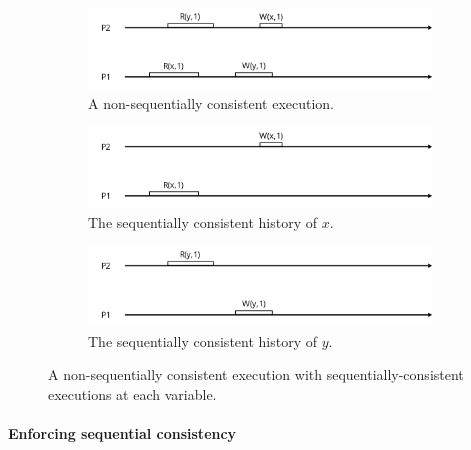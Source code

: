 \documentclass[]             %
{NASA}                       %
\theoremstyle{definition}
\begin{document}
\begin{figure}
     \begin{subfigure}[a]{1\textwidth}
         \center
         \includegraphics[scale=0.4]{images/nonsequential1.png}
         \caption{A non-sequentially consistent execution.}
         \label{fig:nonsequential1}
     \end{subfigure}
     \begin{subfigure}[b]{1\textwidth}
         \center
         \includegraphics[scale=0.4]{images/nonsequential_x.png}
         \caption{The sequentially consistent history of $x$.}
         \label{fig:sequentialx}
     \end{subfigure}
     \begin{subfigure}[b]{1\textwidth}
         \center
         \includegraphics[scale=0.4]{images/nonsequential_y.png}
         \caption{The sequentially consistent history of $y$.}
         \label{fig:sequentialy}
     \end{subfigure}
     \caption{A non-sequentially consistent execution with sequentially-consistent executions at each variable.}
     \label{fig:nonsequential}
\end{figure}

\hypertarget{enforcing-sequential-consistency}{%
\paragraph{Enforcing sequential
consistency}\label{enforcing-sequential-consistency}}
\end{document}
